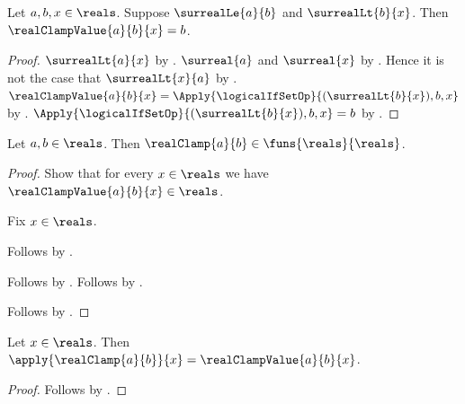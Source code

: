 \begin{proposition}\label{real_clamp_value_above}
    Let $a,b,x\in\reals$.
    Suppose $\surrealLe{a}{b}$ and $\surrealLt{b}{x}$.
    Then $\realClampValue{a}{b}{x}=b$.
\end{proposition}
\begin{proof}
    $\surrealLt{a}{x}$
        by
        .
    $\surreal{a}$ and $\surreal{x}$
        by .
    Hence it is not the case that $\surrealLt{x}{a}$
        by .
    $\realClampValue{a}{b}{x}
        =\Apply{\logicalIfSetOp}{(\surrealLt{b}{x}),b,x}$
        by .
    $\Apply{\logicalIfSetOp}{(\surrealLt{b}{x}),b,x}=b$
        by .
\end{proof}

\begin{proposition}\label{real_clamp_typed_real}
    Let $a,b\in\reals$.
    Then $\realClamp{a}{b}\in\funs{\reals}{\reals}$.
\end{proposition}
\begin{proof}
    Show that for every $x\in\reals$ we have
        $\realClampValue{a}{b}{x}\in\reals$.
    \begin{subproof}
        Fix $x\in\reals$.
        \begin{byCase}
            Follows by .
            \begin{byCase}
                Follows by
                    .
                Follows by
                    .
            \end{byCase}
        \end{byCase}
    \end{subproof}
    Follows by .
\end{proof}

\begin{proposition}\label{real_clamp_apply}
    Let $x\in\reals$.
    Then $\apply{\realClamp{a}{b}}{x}=\realClampValue{a}{b}{x}$.
\end{proposition}
\begin{proof}
    Follows by .
\end{proof}

